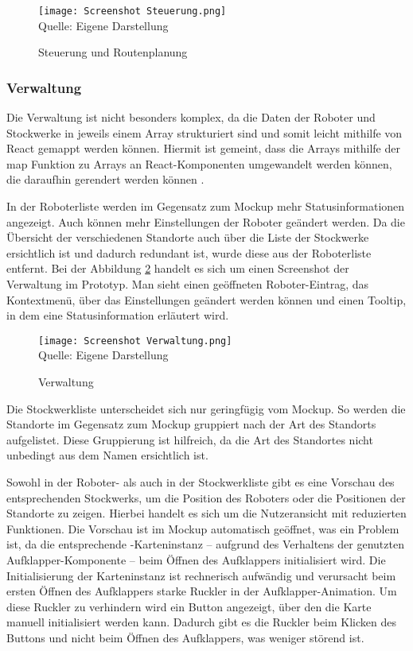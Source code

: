 \begin{figure}[H]
    \caption{Steuerung und Routenplanung}\label{fig:ControlsScreenshot}
    \texttt{[image: Screenshot Steuerung.png]}
    \\
    Quelle: Eigene Darstellung
\end{figure}

\subsubsection{Verwaltung}
Die Verwaltung ist nicht besonders komplex, da die Daten der Roboter und Stockwerke in jeweils einem Array strukturiert sind und somit leicht mithilfe von React gemappt werden können. Hiermit ist gemeint, dass die Arrays mithilfe der map Funktion zu Arrays an React-Komponenten umgewandelt werden können, die daraufhin gerendert werden können \cite[S.~35-36]{Boduch2020}.

In der Roboterliste werden im Gegensatz zum \gls{Mockup} mehr Statusinformationen angezeigt. Auch können mehr Einstellungen der Roboter geändert werden. Da die Übersicht der verschiedenen Standorte auch über die Liste der Stockwerke ersichtlich ist und dadurch redundant ist, wurde diese aus der Roboterliste entfernt. Bei der Abbildung \ref{fig:RobotlistScreenshot} handelt es sich um einen Screenshot der Verwaltung im Prototyp. Man sieht einen geöffneten Roboter-Eintrag, das Kontextmenü, über das Einstellungen geändert werden können und einen Tooltip, in dem eine Statusinformation erläutert wird.

\begin{figure}[H]
    \caption{Verwaltung}\label{fig:RobotlistScreenshot}
    \texttt{[image: Screenshot Verwaltung.png]}
    \\
    Quelle: Eigene Darstellung
\end{figure}

Die Stockwerkliste unterscheidet sich nur geringfügig vom \gls{Mockup}. So werden die Standorte im Gegensatz zum \gls{Mockup} gruppiert nach der Art des Standorts aufgelistet. Diese Gruppierung ist hilfreich, da die Art des Standortes nicht unbedingt aus dem Namen ersichtlich ist.

Sowohl in der Roboter- als auch in der Stockwerkliste gibt es eine Vorschau des entsprechenden Stockwerks, um die Position des Roboters oder die Positionen der Standorte zu zeigen. Hierbei handelt es sich um die Nutzeransicht mit reduzierten Funktionen. Die Vorschau ist im \gls{Mockup} automatisch geöffnet, was ein Problem ist, da die entsprechende \deckgl{}-Karteninstanz – aufgrund des Verhaltens der genutzten Aufklapper-Komponente – beim Öffnen des Aufklappers initialisiert wird. Die Initialisierung der \deckgl{} Karteninstanz ist rechnerisch aufwändig und verursacht beim ersten Öffnen des Aufklappers starke Ruckler in der Aufklapper-Animation. Um diese Ruckler zu verhindern wird ein Button angezeigt, über den die Karte manuell initialisiert werden kann. Dadurch gibt es die Ruckler beim Klicken des Buttons und nicht beim Öffnen des Aufklappers, was weniger störend ist.

